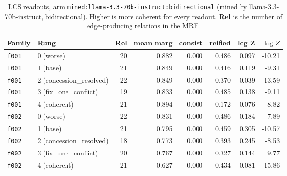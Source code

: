\documentclass[11pt]{article}
\begin{document}
\begin{table}[htbp]
\centering
\small
\caption{LCS readouts, arm \texttt{mined:llama-3.3-70b-instruct:bidirectional} (mined by llama-3.3-70b-instruct, bidirectional). Higher is more coherent for every readout. \textbf{Rel} is the number of edge-producing relations in the MRF.}
\label{tab:scores-mined-llama-3-3-70b-instruct-bidirectional}
\begin{tabular}{llrrrrrr}
\toprule
Family & Rung & Rel & \textbf{mean-marg} & \textbf{consist} & \textbf{reified} & \textbf{log-Z} & $\log Z$ \\
\midrule
\texttt{f001} & 0 (worse) & 20 & 0.882 & 0.000 & 0.486 & 0.097 & -10.21 \\
\texttt{f001} & 1 (base) & 21 & 0.849 & 0.000 & 0.416 & 0.119 & -9.31 \\
\texttt{f001} & 2 (concession\_resolved) & 22 & 0.849 & 0.000 & 0.370 & 0.039 & -13.59 \\
\texttt{f001} & 3 (fix\_one\_conflict) & 19 & 0.833 & 0.000 & 0.485 & 0.138 & -9.11 \\
\texttt{f001} & 4 (coherent) & 21 & 0.894 & 0.000 & 0.172 & 0.076 & -8.82 \\
\midrule
\texttt{f002} & 0 (worse) & 22 & 0.831 & 0.000 & 0.486 & 0.184 & -7.89 \\
\texttt{f002} & 1 (base) & 21 & 0.795 & 0.000 & 0.459 & 0.305 & -10.57 \\
\texttt{f002} & 2 (concession\_resolved) & 18 & 0.773 & 0.000 & 0.393 & 0.245 & -8.53 \\
\texttt{f002} & 3 (fix\_one\_conflict) & 20 & 0.767 & 0.000 & 0.327 & 0.144 & -9.77 \\
\texttt{f002} & 4 (coherent) & 21 & 0.627 & 0.000 & 0.434 & 0.081 & -15.86 \\
\bottomrule
\end{tabular}
\end{table}
\end{document}
